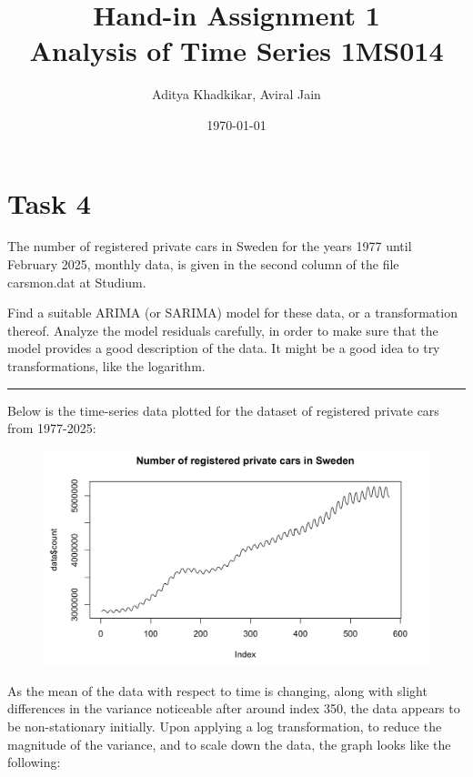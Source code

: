 \documentclass[a4paper,11pt]{article}
\title{\textbf{Hand-in Assignment 1} \\ Analysis of Time Series 1MS014}
\author{Aditya Khadkikar, Aviral Jain}
\date{\today}
\begin{document}
    \maketitle
    \section*{Task 4}
    The number of registered private cars in Sweden for the years 1977 until February 2025, monthly data, is given in the second column of the file carsmon.dat at Studium. 
    
    Find a suitable ARIMA (or SARIMA) model for these data, or a transformation thereof. Analyze the model residuals carefully, in order to make sure that the model provides a good description of the data. It might be a good idea to try transformations, like the logarithm. \\
    
    \hrule

    Below is the time-series data plotted for the dataset of registered private cars from 1977-2025:

    \begin{figure}[H]
        \centering
        \includegraphics[width=1\textwidth]{carsmon-tsplot.png}
        \label{fig:f1}
    \end{figure}

    As the mean of the data with respect to time is changing, along with slight differences in the variance noticeable after around index 350, the data appears to be non-stationary initially. Upon applying a log transformation, to reduce the magnitude of the variance, and to scale down the data, the graph looks like the following:
\end{document}

